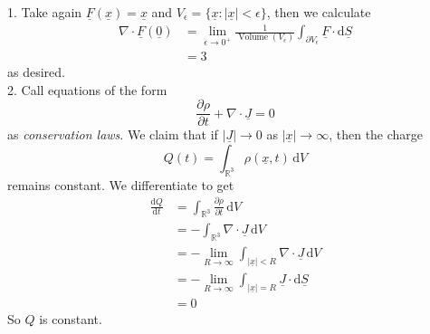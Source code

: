 \begin{example}
    1. Take again $\underline{F}(\underline{x})=\underline{x}$ and $V_\epsilon=\{\underline{x}:|\underline{x}|<\epsilon\}$, then we calculate
    \begin{align*}
        \nabla\cdot\underline{F}(\underline{0})&=\lim_{\epsilon\to 0^+}\frac{1}{\operatorname{Volume}(V_\epsilon)}\int_{\partial V_\epsilon}\underline{F}\cdot\mathrm d\underline{S}\\
        &=3
    \end{align*}
    as desired.\\
    2. Call equations of the form
    $$\frac{\partial\rho}{\partial t}+\nabla\cdot\underline{J}=0$$
    as \textit{conservation laws}.
    We claim that if $|\underline{J}|\to 0$ as $|\underline{x}|\to\infty$, then the charge
    $$Q(t)=\int_{\mathbb R^3}\rho(\underline{x},t)\,\mathrm dV$$
    remains constant.
    We differentiate to get
    \begin{align*}
        \frac{\mathrm dQ}{\mathrm dt}&=\int_{\mathbb R^3}\frac{\partial\rho}{\partial t}\,\mathrm dV\\
        &=-\int_{\mathbb R^3}\nabla\cdot\underline{J}\,\mathrm dV\\
        &=-\lim_{R\to\infty}\int_{|\underline{x}|<R}\nabla\cdot\underline{J}\,\mathrm dV\\
        &=-\lim_{R\to\infty}\int_{|\underline{x}|=R}\underline{J}\cdot\mathrm d\underline{S}\\
        &=0
    \end{align*}
    So $Q$ is constant.
\end{example}